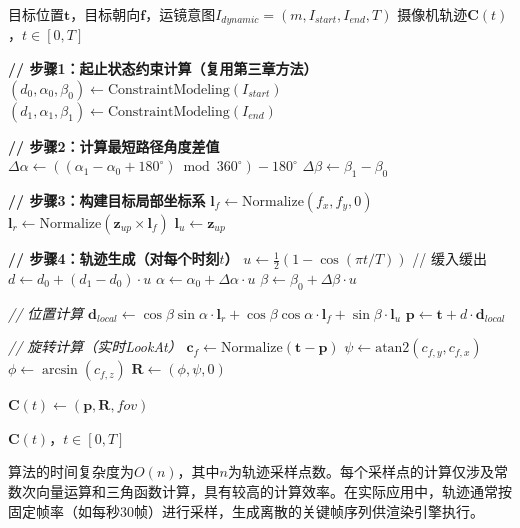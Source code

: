 \begin{algorithm}[htbp]
    \caption{动态运镜轨迹生成算法}
    \label{alg:dynamic_trajectory}
    \begin{algorithmic}[1]
    \REQUIRE 目标位置$\mathbf{t}$，目标朝向$\mathbf{f}$，运镜意图$I_{dynamic} = (m, I_{start}, I_{end}, T)$
    \ENSURE 摄像机轨迹$\mathbf{C}(t)$，$t \in [0, T]$
    
    \STATE \textbf{// 步骤1：起止状态约束计算（复用第三章方法）}
    \STATE $(d_0, \alpha_0, \beta_0) \gets \text{ConstraintModeling}(I_{start})$
    \STATE $(d_1, \alpha_1, \beta_1) \gets \text{ConstraintModeling}(I_{end})$
    
    \STATE \textbf{// 步骤2：计算最短路径角度差值}
    \STATE $\Delta\alpha \gets ((\alpha_1 - \alpha_0 + 180^\circ) \bmod 360^\circ) - 180^\circ$
    \STATE $\Delta\beta \gets \beta_1 - \beta_0$
    
    \STATE \textbf{// 步骤3：构建目标局部坐标系}
    \STATE $\mathbf{l}_f \gets \text{Normalize}(f_x, f_y, 0)$
    \STATE $\mathbf{l}_r \gets \text{Normalize}(\mathbf{z}_{up} \times \mathbf{l}_f)$
    \STATE $\mathbf{l}_u \gets \mathbf{z}_{up}$
    
    \STATE \textbf{// 步骤4：轨迹生成（对每个时刻$t$）}
        \STATE $u \gets \frac{1}{2}(1 - \cos(\pi t / T))$ \quad // 缓入缓出
        \STATE $d \gets d_0 + (d_1 - d_0) \cdot u$
        \STATE $\alpha \gets \alpha_0 + \Delta\alpha \cdot u$
        \STATE $\beta \gets \beta_0 + \Delta\beta \cdot u$
        
        \STATE \textit{// 位置计算}
        \STATE $\mathbf{d}_{local} \gets \cos\beta\sin\alpha \cdot \mathbf{l}_r + \cos\beta\cos\alpha \cdot \mathbf{l}_f + \sin\beta \cdot \mathbf{l}_u$
        \STATE $\mathbf{p} \gets \mathbf{t} + d \cdot \mathbf{d}_{local}$
        
        \STATE \textit{// 旋转计算（实时LookAt）}
        \STATE $\mathbf{c}_f \gets \text{Normalize}(\mathbf{t} - \mathbf{p})$
        \STATE $\psi \gets \text{atan2}(c_{f,y}, c_{f,x})$
        \STATE $\phi \gets \arcsin(c_{f,z})$
        \STATE $\mathbf{R} \gets (\phi, \psi, 0)$
        
        \STATE $\mathbf{C}(t) \gets (\mathbf{p}, \mathbf{R}, \textit{fov})$
    \ENDFOR
    
    \RETURN $\mathbf{C}(t)$，$t \in [0, T]$
    \end{algorithmic}
\end{algorithm}

算法的时间复杂度为$O(n)$，其中$n$为轨迹采样点数。每个采样点的计算仅涉及常数次向量运算和三角函数计算，具有较高的计算效率。在实际应用中，轨迹通常按固定帧率（如每秒30帧）进行采样，生成离散的关键帧序列供渲染引擎执行。

